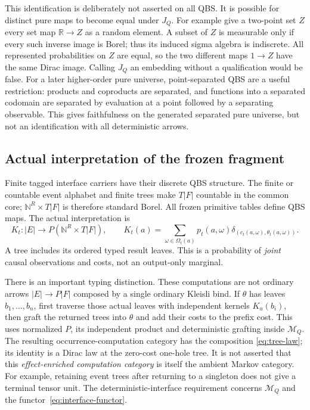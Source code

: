 \documentclass[11pt,a4paper]{article}
\theoremstyle{definition}
\begin{document}
This identification is deliberately not asserted on all QBS. It is possible
for distinct pure maps to become equal under $J_Q$. For example give a
two-point set $Z$ every set map $\mathbb R\to Z$ as a random element.
A subset of $Z$ is measurable only if every such inverse image is Borel;
thus its induced sigma algebra is indiscrete. All represented probabilities
on $Z$ are equal, so the two different maps $1\to Z$ have the same Dirac
image. Calling $J_Q$ an embedding without a qualification would be false.
For a later higher-order pure universe, point-separated QBS are a useful
restriction: products and coproducts are separated, and functions into a
separated codomain are separated by evaluation at a point followed by a
separating observable. This gives faithfulness on the generated separated
pure universe, but not an identification with all deterministic arrows.

\subsection{Actual interpretation of the frozen fragment}
Finite tagged interface carriers have their discrete QBS structure. The
finite or countable event alphabet and finite trees make $T|F|$ countable
in the common core; $\mathbb N^R\times T|F|$ is therefore standard Borel.
All frozen primitive tables define QBS maps. The actual interpretation is
\[
 K_t:|E|\longrightarrow P(\mathbb N^R\times T|F|),\qquad
 K_t(a)=\sum_{\omega\in\Omega_t(a)}
       p_t(a,\omega)\delta_{(c_t(a,\omega),\theta_t(a,\omega))}.
\]
A tree includes its ordered typed result leaves. This is a probability of
\emph{joint} causal observations and costs, not an output-only marginal.

There is an important typing distinction. These computations are not
ordinary arrows $|E|\to P|F|$ composed by a single ordinary Kleisli bind.
If $\theta$ has leaves $b_1,\ldots,b_n$, first traverse those actual leaves
with independent kernels $K_u(b_i)$, then graft the returned trees into
$\theta$ and add their costs to the prefix cost. This uses normalized $P$,
its independent product and deterministic grafting inside $\mathcal M_Q$.
The resulting occurrence-computation category has the composition
\eqref{eq:tree-law}; its identity is a Dirac law at the zero-cost one-hole
tree. It is not asserted that this \emph{effect-enriched computation
category} is itself the ambient Markov category. For example, retaining
event trees after returning to a singleton does not give a terminal tensor
unit. The deterministic-interface requirement concerns $\mathcal M_Q$ and
the functor~\eqref{eq:interface-functor}.
\end{document}
